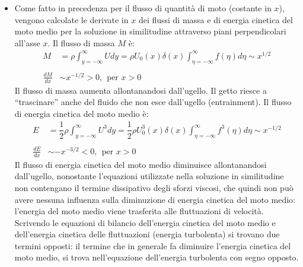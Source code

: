 \begin{itemize}
\item Come fatto in precedenza per il flusso di quantità di moto
 (costante in $x$), vengono calcolate le derivate in $x$ dei flussi
 di massa e di energia cinetica del moto medio per la soluzione in
 similitudine attraverso piani perpendicolari all'asse $x$.
 Il flusso di massa $M$ è:
 \begin{equation}
 \begin{aligned}
   M & = \rho \int_{y=-\infty}^{\infty} U dy =
     \rho U_0(x)\delta(x) \int_{\eta=-\infty}^{\infty} f(\eta) d \eta \sim
     x^{1/2}   \\ \\
   \frac{d M}{dx} & \sim x^{-1/2} > 0  , \ \ \text{per $x>0$}
 \end{aligned}
 \end{equation}
 Il flusso di massa aumenta allontanandosi dall'ugello. Il getto
 riesce a ``trascinare'' anche del fluido che non esce dall'ugello
 (entrainment). Il flusso di energia cinetica del moto medio è:
 \begin{equation}
 \begin{aligned}
   E & = \dfrac{1}{2} \rho \int_{y=-\infty}^{\infty} U^3 dy =
    \dfrac{1}{2} \rho U_0^3(x)\delta(x) 
    \int_{\eta=-\infty}^{\infty} f^3(\eta) d\eta \sim x^{-1/2} \\ \\
   \frac{d E}{dx} & \sim -x^{-3/2} < 0, \ \ \text{per $x>0$} 
 \end{aligned}
 \end{equation}
 Il flusso di energia cinetica del moto medio diminuisce allontanandosi
 dall'ugello, nonostante l'equazioni utilizzate nella soluzione in
 similitudine non contengano il termine dissipativo degli sforzi viscosi,
 che quindi non può avere nessuna influenza sulla diminuzione 
 di energia cinetica del moto medio: l'energia del moto medio viene
 trasferita alle fluttuazioni di velocità. Scrivendo le equazioni
 di bilancio dell'energia cinetica del moto medio e dell'energia cinetica
 delle fluttuazioni (energia turbolenta) si trovano due termini opposti:
 il termine che in generale fa diminuire l'energia cinetica del moto
 medio, si trova nell'equazione dell'energia turbolenta con segno
 opposto.


\end{itemize}
